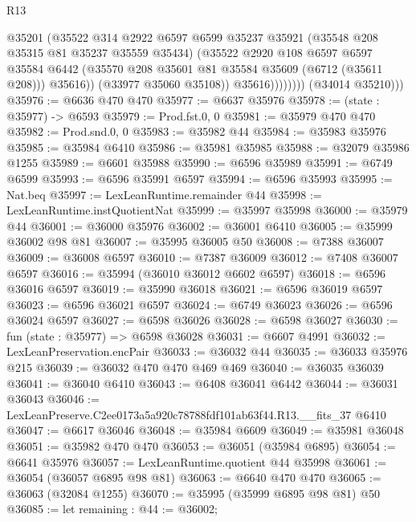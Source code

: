 \begin{lexlean}{R13}
\begin{coremodule}
                          @35201
                          (@35522
                            @314
                            @2922
                            @6597
                            @6599
                            @35237
                            @35921
                            (@35548 @208 @35315 @81 @35237 @35559 @35434)
                            (@35522
                              @2920
                              @108
                              @6597
                              @6597
                              @35584
                              @6442
                              (@35570 @208 @35601 @81 @35584 @35609 (@6712 (@35611 @208)))
                              @35616))
                          (@33977 @35060 @35108))
                        @35616))))))))
        (@34014 @35210)))
@35976 := @6636 @470 @470
@35977 := @6637 @35976
@35978 := (state : @35977) -> @6593
@35979 := Prod.fst.{0, 0}
@35981 := @35979 @470 @470
@35982 := Prod.snd.{0, 0}
@35983 := @35982 @44
@35984 := @35983 @35976
@35985 := @35984 @6410
@35986 := @35981 @35985
@35988 := @32079 @35986 @1255
@35989 := @6601 @35988
@35990 := @6596 @35989
@35991 := @6749 @6599
@35993 := @6596 @35991 @6597
@35994 := @6596 @35993
@35995 := Nat.beq
@35997 := LexLeanRuntime.remainder @44
@35998 := LexLeanRuntime.instQuotientNat
@35999 := @35997 @35998
@36000 := @35979 @44
@36001 := @36000 @35976
@36002 := @36001 @6410
@36005 := @35999 @36002 @98 @81
@36007 := @35995 @36005 @50
@36008 := @7388 @36007
@36009 := @36008 @6597
@36010 := @7387 @36009
@36012 := @7408 @36007 @6597
@36016 := @35994 (@36010 @36012 @6602 @6597)
@36018 := @6596 @36016 @6597
@36019 := @35990 @36018
@36021 := @6596 @36019 @6597
@36023 := @6596 @36021 @6597
@36024 := @6749 @36023
@36026 := @6596 @36024 @6597
@36027 := @6598 @36026
@36028 := @6598 @36027
@36030 := fun (state : @35977) => @6598 @36028
@36031 := @6607 @4991
@36032 := LexLeanPreservation.encPair
@36033 := @36032 @44
@36035 := @36033 @35976 @215
@36039 := @36032 @470 @470 @469 @469
@36040 := @36035 @36039
@36041 := @36040 @6410
@36043 := @6408 @36041 @6442
@36044 := @36031 @36043
@36046 := LexLeanPreserve.C2ee0173a5a920c78788fdf101ab63f44.R13.__fits_37 @6410
@36047 := @6617 @36046
@36048 := @35984 @6609
@36049 := @35981 @36048
@36051 := @35982 @470 @470
@36053 := @36051 (@35984 @6895)
@36054 := @6641 @35976
@36057 := LexLeanRuntime.quotient @44 @35998
@36061 := @36054 (@36057 @6895 @98 @81)
@36063 := @6640 @470 @470
@36065 := @36063 (@32084 @1255)
@36070 := @35995 (@35999 @6895 @98 @81) @50
@36085 := let remaining : @44 := @36002;

\end{coremodule}
\end{lexlean}
